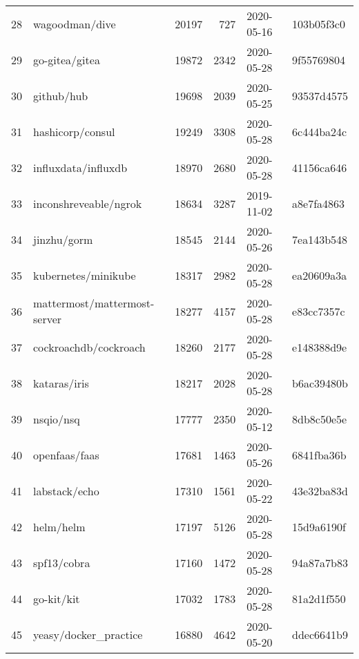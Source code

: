 \begin{longtable}{llrrll}
    28  &                                     wagoodman/dive &  20197 &    727 & 2020-05-16 &  103b05f3c0 \\
    29  &                                     go-gitea/gitea &  19872 &   2342 & 2020-05-28 &  9f55769804 \\
    30  &                                         github/hub &  19698 &   2039 & 2020-05-25 &  93537d4575 \\
    31  &                                   hashicorp/consul &  19249 &   3308 & 2020-05-28 &  6c444ba24c \\
    32  &                                influxdata/influxdb &  18970 &   2680 & 2020-05-28 &  41156ca646 \\
    33  &                              inconshreveable/ngrok &  18634 &   3287 & 2019-11-02 &  a8e7fa4863 \\
    34  &                                        jinzhu/gorm &  18545 &   2144 & 2020-05-26 &  7ea143b548 \\
    35  &                                kubernetes/minikube &  18317 &   2982 & 2020-05-28 &  ea20609a3a \\
    36  &                       mattermost/mattermost-server &  18277 &   4157 & 2020-05-28 &  e83cc7357c \\
    37  &                              cockroachdb/cockroach &  18260 &   2177 & 2020-05-28 &  e148388d9e \\
    38  &                                       kataras/iris &  18217 &   2028 & 2020-05-28 &  b6ac39480b \\
    39  &                                          nsqio/nsq &  17777 &   2350 & 2020-05-12 &  8db8c50e5e \\
    40  &                                      openfaas/faas &  17681 &   1463 & 2020-05-26 &  6841fba36b \\
    41  &                                      labstack/echo &  17310 &   1561 & 2020-05-22 &  43e32ba83d \\
    42  &                                          helm/helm &  17197 &   5126 & 2020-05-28 &  15d9a6190f \\
    43  &                                        spf13/cobra &  17160 &   1472 & 2020-05-28 &  94a87a7b83 \\
    44  &                                         go-kit/kit &  17032 &   1783 & 2020-05-28 &  81a2d1f550 \\
    45  &                              yeasy/docker\_practice &  16880 &   4642 & 2020-05-20 &  ddec6641b9 \\

\end{longtable}
